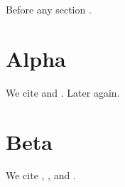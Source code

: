 \documentclass{article}
\begin{document}
Before any section \cite{pre}.
\section{Alpha}
We cite \cite{a1} and \cite{a2}. Later \cite{a1} again.
\section{Beta}
We cite \cite{b1}, \cite{a2}, and \cite{b2}.
\end{document}
